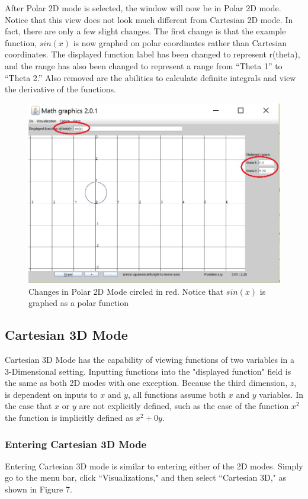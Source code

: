 \documentclass{article}[12 pt]
\begin{document}
			After Polar 2D mode is selected, the window will now be in Polar 2D mode. Notice that this view does not look much different from Cartesian 2D mode. In fact, there are only a few slight changes. The first change is that the example function, $sin(x)$ is now graphed on polar coordinates rather than Cartesian coordinates. The displayed function label has been changed to represent r(theta), and the range has also been changed to represent a range from ``Theta 1'' to ``Theta 2.'' Also removed are the abilities to calculate definite integrals and view the derivative of the functions.
				\begin{figure}[h!]
				\centering
				 \includegraphics[scale=.70]{polarMode}
				 \caption{Changes in Polar 2D Mode circled in red. Notice that $sin(x)$ is graphed as a polar function}
				\end{figure}
				\pagebreak
	\subsection{Cartesian 3D Mode}
		Cartesian 3D Mode has the capability of viewing functions of two variables in a 3-Dimensional setting. Inputting functions into the "displayed function" field is the same as both 2D modes with one exception. Because the third dimension, $z$, is dependent on inputs to $x$ and $y$, all functions assume both $x$ and $y$ variables. In the case that $x$ or $y$ are not explicitly defined, such as the case of the function $x^2$ the function is implicitly defined as $x^2 + 0y$. 
	
		\subsubsection{Entering Cartesian 3D Mode}
		Entering Cartesian 3D mode is similar to entering either of the 2D modes. Simply go to the menu bar, click ``Visualizations," and then select ``Cartesian 3D," as shown in Figure 7.
\end{document}
